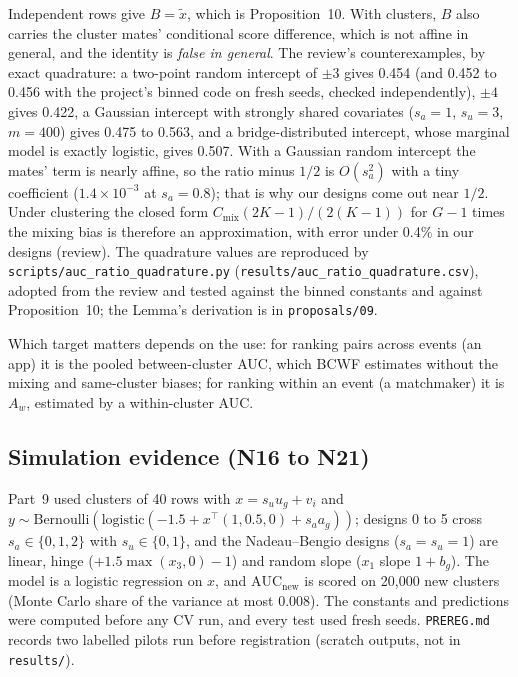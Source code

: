 \documentclass[11pt]{amsart}
\theoremstyle{plain}
\theoremstyle{definition}
\theoremstyle{remark}
\newcommand{\Cmix}{C_{\mathrm{mix}}}
\begin{document}
Independent rows give $B=\tilde x$, which is Proposition~10. With clusters, $B$ also carries the cluster mates' conditional score difference, which is not affine in general, and the identity is \emph{false in general}. The review's counterexamples, by exact quadrature: a two-point random intercept of $\pm3$ gives 0.454 (and 0.452 to 0.456 with the project's binned code on fresh seeds, checked independently), $\pm4$ gives 0.422, a Gaussian intercept with strongly shared covariates ($s_a=1$, $s_u=3$, $m=400$) gives 0.475 to 0.563, and a bridge-distributed intercept, whose marginal model is exactly logistic, gives 0.507. With a Gaussian random intercept the mates' term is nearly affine, so the ratio minus $1/2$ is $O(s_a^2)$ with a tiny coefficient ($1.4\times10^{-3}$ at $s_a=0.8$); that is why our designs come out near $1/2$. Under clustering the closed form $\Cmix(2K-1)/(2(K-1))$ for $G-1$ times the mixing bias is therefore an approximation, with error under 0.4\% in our designs (review). The quadrature values are reproduced by \texttt{scripts/auc\_ratio\_quadrature.py} (\texttt{results/auc\_ratio\_quadrature.csv}), adopted from the review and tested against the binned constants and against Proposition~10; the Lemma's derivation is in \texttt{proposals/09}.

Which target matters depends on the use: for ranking pairs across events (an app) it is the pooled between-cluster AUC, which BCWF estimates without the mixing and same-cluster biases; for ranking within an event (a matchmaker) it is $A_w$, estimated by a within-cluster AUC.

\subsection{Simulation evidence (N16 to N21)}
Part~9 used clusters of 40 rows with $x=s_uu_g+v_i$ and $y\sim\mathrm{Bernoulli}(\mathrm{logistic}(-1.5+x^\top(1,0.5,0)+s_aa_g))$; designs 0 to 5 cross $s_a\in\{0,1,2\}$ with $s_u\in\{0,1\}$, and the Nadeau--Bengio designs ($s_a=s_u=1$) are linear, hinge ($+1.5\max(x_3,0)-1$) and random slope ($x_1$ slope $1+b_g$). The model is a logistic regression on $x$, and $\mathrm{AUC}_{\mathrm{new}}$ is scored on 20,000 new clusters (Monte Carlo share of the variance at most 0.008). The constants and predictions were computed before any CV run, and every test used fresh seeds. \texttt{PREREG.md} records two labelled pilots run before registration (scratch outputs, not in \texttt{results/}).
\end{document}
